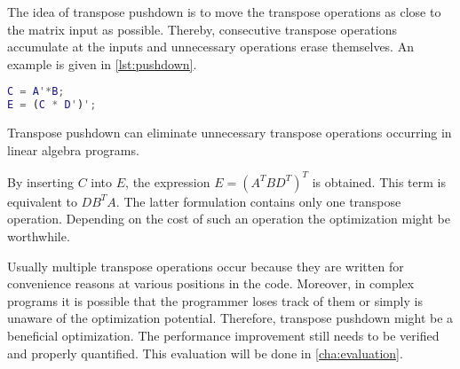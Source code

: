 The idea of transpose pushdown is to move the transpose operations as close to the matrix input as possible.
Thereby, consecutive transpose operations accumulate at the inputs and unnecessary operations erase themselves.
An example is given in \cref{lst:pushdown}.

\begin{listing}[!h]
	\begin{CenteredBox}
		\begin{lstlisting}[language=Matlab]
C = A'*B;
E = (C * D')';
		\end{lstlisting}
	\end{CenteredBox}
	\caption{Transpose pushdown can eliminate unnecessary transpose operations occurring in linear algebra programs.}
	\label{lst:pushdown}
\end{listing}

By inserting $C$ into $E$, the expression $E=(A^T BD^T)^T$ is obtained. This term is equivalent to $DB^T A$.
The latter formulation contains only one transpose operation.
Depending on the cost of such an operation the optimization might be worthwhile.

Usually multiple transpose operations occur because they are written for convenience reasons at various positions in the code.
Moreover, in complex programs it is possible that the programmer loses track of them or simply is unaware of the optimization potential.
Therefore, transpose pushdown might be a beneficial optimization.
The performance improvement still needs to be verified and properly quantified.
This evaluation will be done in \cref{cha:evaluation}.